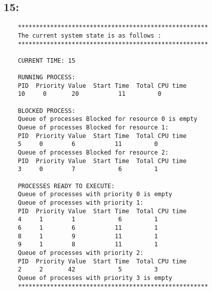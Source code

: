\documentclass{article}
\begin{document}
\subsection*{15:}
\begin{verbatim}
    *****************************************************
    The current system state is as follows : 
    *****************************************************
    
    CURRENT TIME: 15

    RUNNING PROCESS:
    PID  Priority Value  Start Time  Total CPU time
    10     0       20           11         0

    BLOCKED PROCESS:
    Queue of processes Blocked for resource 0 is empty
    Queue of processes Blocked for resource 1:
    PID  Priority Value  Start Time  Total CPU time
    5     0        6           11         0
    Queue of processes Blocked for resource 2:
    PID  Priority Value  Start Time  Total CPU time
    3     0        7            6         1

    PROCESSES READY TO EXECUTE:
    Queue of processes with priority 0 is empty
    Queue of processes with priority 1:
    PID  Priority Value  Start Time  Total CPU time
    4     1        1            6         1
    6     1        6           11         1
    8     1        9           11         1
    9     1        8           11         1
    Queue of processes with priority 2:
    PID  Priority Value  Start Time  Total CPU time
    2     2       42            5         3
    Queue of processes with priority 3 is empty
    *****************************************************
\end{verbatim}
\end{document}
